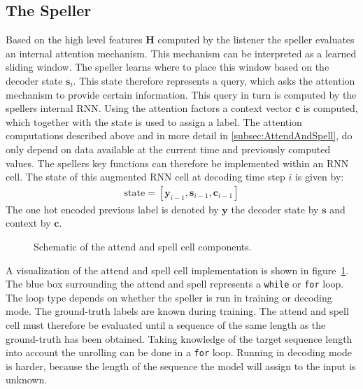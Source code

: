\subsection{The Speller}
Based on the high level features $\mathbf{H}$ computed by the listener the speller evaluates an internal attention mechanism. This mechanism can be interpreted as a learned sliding window. The speller learns where to place this window based on the decoder state $\mathbf{s}_i$. This state therefore represents a query, which asks the attention mechanism to provide certain information. This query in turn is computed by the spellers internal RNN.  Using the attention factors a context vector $\mathbf{c}$ is computed, which together with the state is used to assign a label. 
The attention computations described above and in more detail in \ref{subsec:AttendAndSpell}, do only depend on data available at the current time and previously computed values. The spellers key functions can therefore be implemented within an RNN cell. The state of this augmented RNN cell at decoding time step $i$ is given by:
\begin{align}
\text{state} =  [\mathbf{y}_{i-1}, \mathbf{s}_{i-1}, \mathbf{c}_{i-1}]
\end{align}
The one hot encoded previous label is denoted by $\mathbf{y}$ the decoder state by $\mathbf{s}$ and context by $\mathbf{c}$.
\begin{figure}
\centering

\caption{Schematic of the attend and spell cell components.}
\label{fig:asCell}
\end{figure}
A visualization of the attend and spell cell implementation is shown in figure~\ref{fig:asCell}. The blue box surrounding the attend and spell represents a \texttt{while} or \texttt{for} loop. The loop type depends on whether the speller is run in training or decoding mode. 
The ground-truth labels are known during training. The attend and spell cell must therefore be evaluated until a sequence of the same length as the ground-truth has been obtained. Taking knowledge of the target sequence length into account the unrolling can be done in a \texttt{for} loop. 
Running in decoding mode is harder, because the length of the sequence the model will assign to the input is unknown. 

